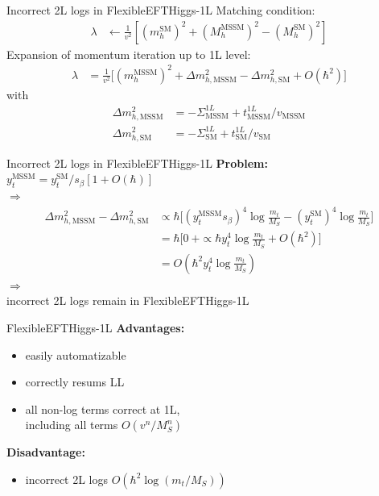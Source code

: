 \documentclass[hyperref={pdfpagelabels=false},ngerman]{beamer}
\newcommand{\cmark}{\ding{51}}%
\newcommand{\xmark}{\ding{55}}%
\newcommand{\ok}{\textcolor{darkgreen}{\cmark}}
\newcommand{\notok}{\textcolor{red}{\xmark}}
\renewcommand{\emph}{\textbf}
\newcommand{\SM}{\ensuremath{\text{SM}}}
\newcommand{\MSSM}{\ensuremath{\text{MSSM}}}
\begin{document}
\begin{frame}{Incorrect 2L logs in FlexibleEFTHiggs-1L}
  Matching condition:
  \begin{align*}
    \lambda &\leftarrow \frac{1}{v^2} \left[
      (m_h^\SM)^2 + (M_h^\text{MSSM})^2 - (M_h^\SM)^2
    \right]
  \end{align*}
  Expansion of momentum iteration up to 1L level:
  \begin{align*}
    \lambda &= \frac{1}{v^2} \Big[
      (m_h^\MSSM)^2
      + \Delta m_{h,\MSSM}^2
      - \Delta m_{h,\SM}^2
      + O(\hbar^2)
    \Big]
  \end{align*}
  with
  \begin{align*}
    \Delta m_{h,\MSSM}^2 &= -\Sigma^{1L}_{\MSSM} + t_{\MSSM}^{1L}/v_\MSSM \\
    \Delta m_{h,\SM}^2 &= -\Sigma^{1L}_{\SM} + t^{1L}_{\SM}/v_\SM
  \end{align*}
\end{frame}

\begin{frame}{Incorrect 2L logs in FlexibleEFTHiggs-1L}
  \emph{Problem:} $y_t^{\MSSM} = y_t^\SM/s_\beta [1 + O(\hbar)] $\\
  $\Rightarrow$
  \begin{align*}
    \Delta m_{h,\MSSM}^2 - \Delta m_{h,\SM}^2 &\propto
    \hbar \Bigg[ (y_t^\MSSM s_\beta)^4 \log\frac{m_t}{M_S} - (y_t^\SM)^4 \log\frac{m_t}{M_S}\Bigg] \\
    &= \hbar \Bigg[0\ + \propto \hbar y_t^4 \log\frac{m_t}{M_S} + O(\hbar^2) \Bigg] \\
    &= O(\hbar^2 y_t^4 \log\frac{m_t}{M_S})
  \end{align*}
  $\Rightarrow$\\
  incorrect 2L logs remain in FlexibleEFTHiggs-1L
\end{frame}

\begin{frame}{FlexibleEFTHiggs-1L}
  \emph{Advantages:}
  \begin{itemize}
  \item[\ok] easily automatizable
  \item[\ok] correctly resums LL
  \item[\ok] all non-log terms correct at 1L, \\
    including all terms $O(v^n/M_S^n)$
  \end{itemize}
  \emph{Disadvantage:}
  \begin{itemize}
  \item[\notok] incorrect 2L logs $O(\hbar^2 \log(m_t/M_S))$
  \end{itemize}
\end{frame}
\end{document}
